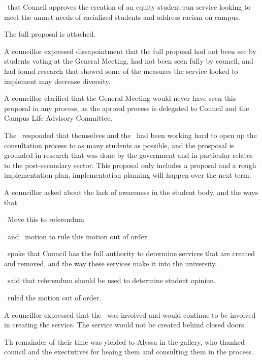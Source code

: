 \heading{ }
\begin{motion}
    \birt\ that Council approves the creation of an equity student-run service
    looking to meet the unmet needs of racialized students and address racism
    on campus.
    \movers{\antonio}{\rebecca}

    The full proposal is attached.

    A councillor expressed dissapointment that the full proposal had not been
    see by students voting at the General Meeting, had not been seen fully by
    council, and had found research that showed some of the measures the 
    service looked to implement may decrease diversity.

    A councillor clarified that the General Meeting would never have seen this
    proposal in any process, as the aproval process is delegated to Council and
    the Campus Life Advisory Committee. 

    The \pres\ responded that themselves and the \vpi\ had been working hard
    to open up the consultation process to as many students as possible, and
    the prosposal is grounded in research that was done by the government and
    in particular relates to the post-secondary sector. This proposal only 
    includes a proposal and a rough implementation plan, implementation 
    planning will happen over the next term.

    A councillor asked about the lack of awareness in the student body, and 
    the ways that 

    \begin{motion}
        \birt\ Move this to referendum
        \movers{\harsh}{\alexander}

        \seneca\ and \antonio\ motion to rule this motion out of order.

        \seneca\ spoke that Council has the full authority to determine services that are created
        and removed, and the way these services make it into the university.

        \harsh\ said that referendum should be used to determine student opinion.

        \elizabeth\ ruled the motion out of order.
    \end{motion} 

    A councillor expressed that the \clac\ was involved and would continue to
    be involved in creating the service. The service would not be created 
    behind closed doors. 

    Th remainder of their time was yielded to Alyssa in 
    the gallery, who thanked council and the exectutives for heaing them and
    consulting them in the process. 


\end{motion}
